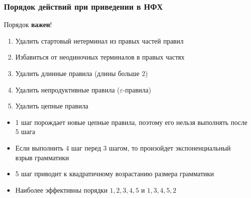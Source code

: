 \documentclass{beamer}
\begin{document}
\begin{frame}[fragile]
  \transwipe[direction=90]
  \frametitle{Порядок действий при приведении в НФХ}      
  Порядок \textbf{важен}!
  
  \begin{enumerate}
    \item Удалить стартовый нетерминал из правых частей правил 
    \item Избавиться от неодиночных терминалов в правых частях 
    \item Удалить длинные правила (длины больше 2)
    \item Удалить непродуктивные правила ($\varepsilon$-правила)
    \item Удалить цепные правила
  \end{enumerate}

  \begin{itemize}
    \item 1 шаг порождает новые цепные правила, поэтому его нельзя выполнять после 5 шага
    \item Если выполнить 4 шаг перед 3 шагом, то произойдет экспоненциальный взрыв грамматики
    \item 5 шаг приводит к квадратичному возрастанию размера грамматики
    \item Наиболее эффективны порядки $1, 2, 3, 4, 5$ и $1,3, 4,5,2$
  \end{itemize}
\end{frame}
\end{document}
